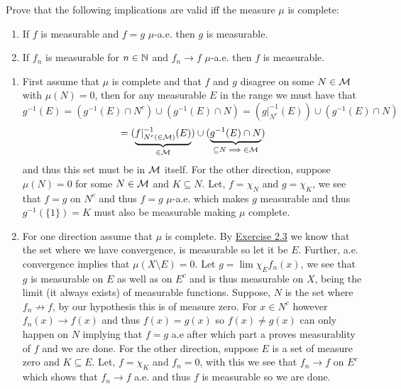 \documentclass[12pt,a4paper]{article}
\begin{document}
\begin{problem}\label{prob:2-10}
Prove that the following implications are valid iff the measure $\mu$ is complete:
\begin{enumerate}[label=\alph*.]
    \item If $f$ is measurable and $f=g$ $\mu$-a.e. then $g$ is measurable.
    \item If $f_n$ is measurable for $n\in\mathbb{N}$ and $f_n\longrightarrow f$ $\mu$-a.e. then $f$ is measurable. 
\end{enumerate}
\end{problem}
\begin{solution}
    \begin{enumerate}[label=\alph*.]
        \item First assume that $\mu$ is complete and that $f$ and $g$ disagree on some $N\in\mathcal{M}$ with $\mu(N)=0$, then for any measurable $E$ in the range we must have that 
        $$g^{-1}(E)=(g^{-1}(E)\cap N^c)\cup(g^{-1}(E)\cap N)=(g|_{N^c}^{-1}(E))\cup(g^{-1}(E)\cap N)$$
        $$=(\underbrace{f|_{N^c(\in\mathcal{M})}^{-1}(E)}_{\in\mathcal{M}})\cup(\underbrace{g^{-1}(E)\cap N}_{\subseteq N\implies\in\mathcal{M}})$$
        and thus this set must be in $\mathcal{M}$ itself. 
        For the other direction, suppose $\mu(N)=0$ for some $N\in\mathcal{M}$ and $K\subseteq N$. 
        Let, $f=\chi_N$ and $g=\chi_K$, we see that $f=g$ on $N^c$ and thus $f=g$ $\mu$-a.e. which makes $g$ measurable and thus $g^{-1}(\{1\})=K$ must also be measurable making $\mu$ complete. 
        \item For one direction assume that $\mu$ is complete. 
        By \hyperref[prob:2-3]{Exercise 2.3} we know that the set where we have convergence, is measurable so let it be $E$. 
        Further, a.e. convergence implies that $\mu(X\setminus E)=0$. 
        Let $g=\lim\chi_E f_n(x)$, we see that $g$ is measurable on $E$ as well as on $E^c$ and is thus measurable on $X$, being the limit (it always exists) of measurable functions. 
        Suppose, $N$ is the set where $f_n\not\longrightarrow f$, by our hypothesis this is of measure zero. 
        For $x\in N^c$ however $f_n(x)\longrightarrow f(x)$ and thus $f(x)=g(x)$ so $f(x)\neq g(x)$ can only happen on $N$ implying that $f=g$ a.e after which part a proves measurablity of $f$ and we are done. 
        For the other direction, suppose $E$ is a set of measure zero and $K\subseteq E$. 
        Let, $f=\chi_K$ and $f_n=0$, with this we see that $f_n\to f$ on $E^c$ which shows that $f_n\to f$ a.e. and thus $f$ is measurable so we are done. 
    \end{enumerate}
\end{solution}
\end{document}
